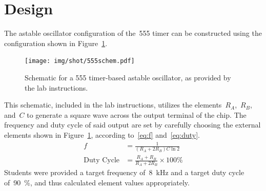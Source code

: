 \section{Design}

The astable oscillator configuration of the~555 timer can be constructed using
the configuration shown in Figure~\ref{f:astable}.
%
\begin{figure}[H]
\centering
	\texttt{[image: img/shot/555schem.pdf]}
	\parbox{.6\textwidth}{
	\caption[Astable Oscillator Schematic]{Schematic for a 555 timer-based
	astable oscillator, as provided by the lab instructions.}
	\label{f:astable}}
\end{figure}
%
This schematic, included in the lab instructions, utilizes the
elements~$R_A$,~$R_B$, and~$C$ to generate a square wave across the output
terminal of the chip.  The frequency and duty cycle of said output are set by
carefully choosing the external elements shown in Figure~\ref{f:astable},
according to~\eqref{eq:f} and~\eqref{eq:duty}.
%
\begin{align}
	f &= \frac{1}{ \left( R_A + 2 R_B \right) C \ln{2} } \label{eq:f}\\
	\text{Duty Cycle} &= \frac{R_A + R_B}{R_A + 2 R_B} \times 100\% \label{eq:duty}
\end{align}
%
Students were provided a target frequency of~\SI{8}{\kilo\hertz} and a target
duty cycle of~\SI{90}{\percent}, and thus calculated element values appropriately.

